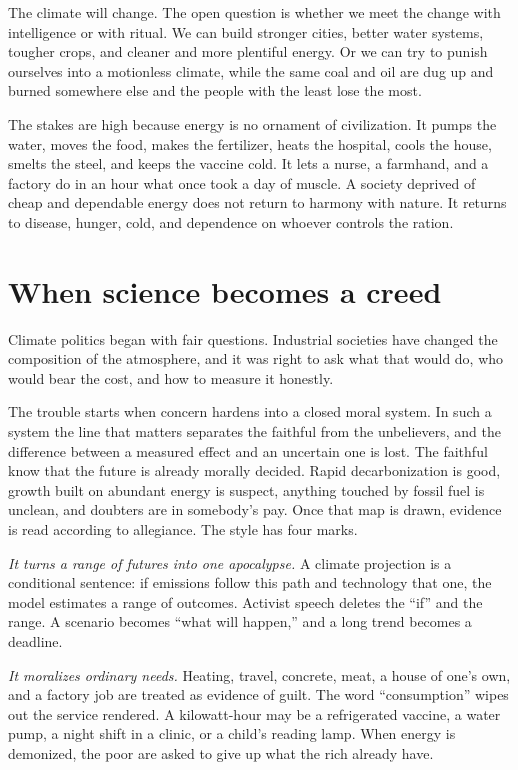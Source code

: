\documentclass[12pt,a4paper]{book}
\begin{document}
The climate will change. The open question is whether we meet the change with intelligence or with ritual. We can build stronger cities, better water systems, tougher crops, and cleaner and more plentiful energy. Or we can try to punish ourselves into a motionless climate, while the same coal and oil are dug up and burned somewhere else and the people with the least lose the most.

The stakes are high because energy is no ornament of civilization. It pumps the water, moves the food, makes the fertilizer, heats the hospital, cools the house, smelts the steel, and keeps the vaccine cold. It lets a nurse, a farmhand, and a factory do in an hour what once took a day of muscle. A society deprived of cheap and dependable energy does not return to harmony with nature. It returns to disease, hunger, cold, and dependence on whoever controls the ration.

\section{When science becomes a creed}

Climate politics began with fair questions. Industrial societies have changed the composition of the atmosphere, and it was right to ask what that would do, who would bear the cost, and how to measure it honestly.

The trouble starts when concern hardens into a closed moral system. In such a system the line that matters separates the faithful from the unbelievers, and the difference between a measured effect and an uncertain one is lost. The faithful know that the future is already morally decided. Rapid decarbonization is good, growth built on abundant energy is suspect, anything touched by fossil fuel is unclean, and doubters are in somebody's pay. Once that map is drawn, evidence is read according to allegiance. The style has four marks.

\emph{It turns a range of futures into one apocalypse.} A climate projection is a conditional sentence: if emissions follow this path and technology that one, the model estimates a range of outcomes. Activist speech deletes the ``if'' and the range. A scenario becomes ``what will happen,'' and a long trend becomes a deadline.

\emph{It moralizes ordinary needs.} Heating, travel, concrete, meat, a house of one's own, and a factory job are treated as evidence of guilt. The word ``consumption'' wipes out the service rendered. A kilowatt-hour may be a refrigerated vaccine, a water pump, a night shift in a clinic, or a child's reading lamp. When energy is demonized, the poor are asked to give up what the rich already have.
\end{document}
